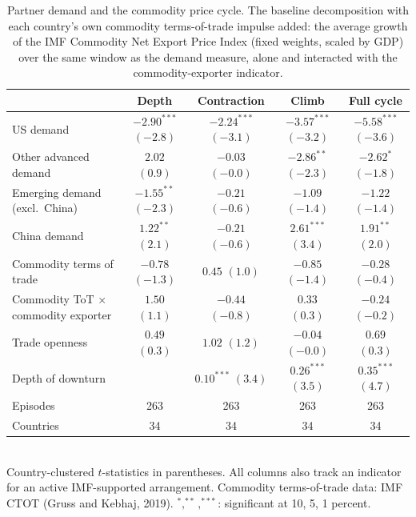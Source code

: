 \begin{table}[H]
\centering
\footnotesize
\setlength{\tabcolsep}{4pt}
\caption{Partner demand and the commodity price cycle. The baseline decomposition with each country's own commodity terms-of-trade impulse added: the average growth of the IMF Commodity Net Export Price Index (fixed weights, scaled by GDP) over the same window as the demand measure, alone and interacted with the commodity-exporter indicator.}
\label{tab:commodity}
\begin{tabular}{lcccc}
\toprule
 & Depth & Contraction & Climb & Full cycle \\
\midrule
US demand & $-2.90^{***}$ {\scriptsize$(-2.8)$} & $-2.24^{***}$ {\scriptsize$(-3.1)$} & $-3.57^{***}$ {\scriptsize$(-3.2)$} & $-5.58^{***}$ {\scriptsize$(-3.6)$} \\
Other advanced demand & $2.02$ {\scriptsize$(0.9)$} & $-0.03$ {\scriptsize$(-0.0)$} & $-2.86^{**}$ {\scriptsize$(-2.3)$} & $-2.62^{*}$ {\scriptsize$(-1.8)$} \\
Emerging demand (excl.\ China) & $-1.55^{**}$ {\scriptsize$(-2.3)$} & $-0.21$ {\scriptsize$(-0.6)$} & $-1.09$ {\scriptsize$(-1.4)$} & $-1.22$ {\scriptsize$(-1.4)$} \\
China demand & $1.22^{**}$ {\scriptsize$(2.1)$} & $-0.21$ {\scriptsize$(-0.6)$} & $2.61^{***}$ {\scriptsize$(3.4)$} & $1.91^{**}$ {\scriptsize$(2.0)$} \\
Commodity terms of trade & $-0.78$ {\scriptsize$(-1.3)$} & $0.45$ {\scriptsize$(1.0)$} & $-0.85$ {\scriptsize$(-1.4)$} & $-0.28$ {\scriptsize$(-0.4)$} \\
Commodity ToT $\times$ commodity exporter & $1.50$ {\scriptsize$(1.1)$} & $-0.44$ {\scriptsize$(-0.8)$} & $0.33$ {\scriptsize$(0.3)$} & $-0.24$ {\scriptsize$(-0.2)$} \\
Trade openness & $0.49$ {\scriptsize$(0.3)$} & $1.02$ {\scriptsize$(1.2)$} & $-0.04$ {\scriptsize$(-0.0)$} & $0.69$ {\scriptsize$(0.3)$} \\
Depth of downturn &  & $0.10^{***}$ {\scriptsize$(3.4)$} & $0.26^{***}$ {\scriptsize$(3.5)$} & $0.35^{***}$ {\scriptsize$(4.7)$} \\
\midrule
Episodes & 263 & 263 & 263 & 263 \\
Countries & 34 & 34 & 34 & 34 \\
\bottomrule\end{tabular}
\\[2pt]\footnotesize{Country-clustered $t$-statistics in parentheses. All columns also track an indicator for an active IMF-supported arrangement. Commodity terms-of-trade data: IMF CTOT (Gruss and Kebhaj, 2019). $^{*},^{**},^{***}$: significant at 10, 5, 1 percent.}
\end{table}
